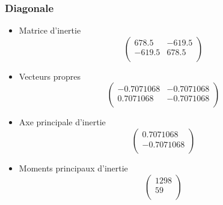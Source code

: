 \documentclass[a4paper,12pt]{report}
\begin{document}
\subsubsection*{Diagonale}
\begin{itemize}
\item Matrice d'inertie 
\[
   \left (
   \begin{array}{cc}
      678.5 & -619.5 \\
      -619.5 & 678.5 \\
   \end{array}
   \right )
\]

\item Vecteurs propres
\[
   \left (
   \begin{array}{cc}
      -0.7071068 & -0.7071068  \\
      0.7071068 & -0.7071068 \\
   \end{array}
   \right )
\]

\item Axe principale d'inertie
\[
   \left (
   \begin{array}{c}
      0.7071068 \\
      -0.7071068 \\
   \end{array}
   \right )
\]

\item Moments principaux d'inertie
\[
   \left (
   \begin{array}{c}
      1298 \\
      59 \\
   \end{array}
   \right )
\]

\end{itemize}
\end{document}
